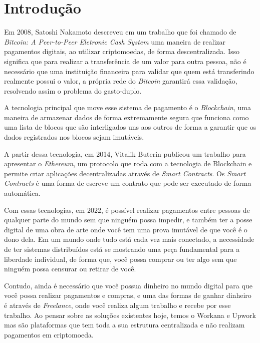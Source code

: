 \chapter{Introdução}

Em 2008, Satoshi Nakamoto descreveu em um trabalho que foi chamado de \textit{Bitcoin: A Peer-to-Peer Eletronic Cash System} uma maneira de realizar pagamentos digitais, ao utilizar criptomoedas, de forma descentralizada. Isso significa que para realizar a transferência de um valor para outra pessoa, não é necessário que uma instituição financeira para validar que quem está transferindo realmente possui o valor, a própria rede do \textit{Bitcoin} garantirá essa validação, resolvendo assim o problema do gasto-duplo.\cite{bitcoin}

A tecnologia principal que move esse sistema de pagamento é o \textit{Blockchain}, uma maneira de armazenar dados de forma extremamente segura que funciona como uma lista de blocos que são interligados uns aos outros de forma a garantir que os dados registrados nos blocos sejam imutáveis.\cite{blockchain}

A partir dessa tecnologia, em 2014, Vitalik Buterin publicou um trabalho para apresentar o \textit{Ethereum}, um protocolo que roda com a tecnologia de Blockchain e permite criar aplicações decentralizadas através de \textit{Smart Contracts}.\cite{ethereum} \cite{ethereum_yellow} Os \textit{Smart Contracts} é uma forma de escreve um contrato que pode ser executado de forma automática.\cite{smart_contract} \cite{smart_contract_blockchain}

Com essas tecnologias, em 2022, é possível realizar pagamentos entre pessoas de qualquer parte do mundo sem que ninguém possa impedir, e também ter a posse digital de uma obra de arte onde você tem uma prova imutável de que você é o dono dela. Em um mundo onde tudo está cada vez mais conectado, a necessidade de ter sistemas distribuídos está se mostrando uma peça fundamental para a liberdade individual, de forma que, você possa comprar ou ter algo sem que ninguém possa censurar ou retirar de você.\cite{decentralization}

Contudo, ainda é necessário que você possua dinheiro no mundo digital para que você possa realizar pagamentos e compras, e uma das formas de ganhar dinheiro é através de \textit{Freelance}, onde você realiza algum trabalho e recebe por esse trabalho. Ao pensar sobre as soluções existentes hoje, temos o Workana e Upwork mas são plataformas que tem toda a sua estrutura centralizada e não realizam pagamentos em criptomoeda.

